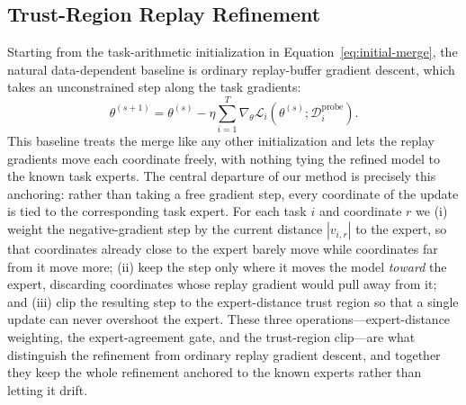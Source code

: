 \documentclass[11pt]{article}
\newcommand{\loss}{\mathcal{L}}
\newcommand{\data}{\mathcal{D}}
\begin{document}
\subsection{Trust-Region Replay Refinement}
\label{sec:replay-refinement}
Starting from the task-arithmetic initialization in Equation~\eqref{eq:initial-merge}, the natural data-dependent baseline is ordinary replay-buffer gradient descent, which takes an unconstrained step along the task gradients:
\begin{equation}
    \theta^{(s+1)}
    =
    \theta^{(s)}
    -
    \eta \sum_{i=1}^{T}
    \nabla_\theta \loss_i(\theta^{(s)};\data_i^{\mathrm{probe}}).
    \label{eq:naive-replay-gd}
\end{equation}
This baseline treats the merge like any other initialization and lets the replay gradients move each coordinate freely, with nothing tying the refined model to the known task experts. The central departure of our method is precisely this anchoring: rather than taking a free gradient step, every coordinate of the update is tied to the corresponding task expert. For each task $i$ and coordinate $r$ we (i) weight the negative-gradient step by the current distance $|v_{i,r}|$ to the expert, so that coordinates already close to the expert barely move while coordinates far from it move more; (ii) keep the step only where it moves the model \emph{toward} the expert, discarding coordinates whose replay gradient would pull away from it; and (iii) clip the resulting step to the expert-distance trust region so that a single update can never overshoot the expert. These three operations---expert-distance weighting, the expert-agreement gate, and the trust-region clip---are what distinguish the refinement from ordinary replay gradient descent, and together they keep the whole refinement anchored to the known experts rather than letting it drift.
\end{document}

